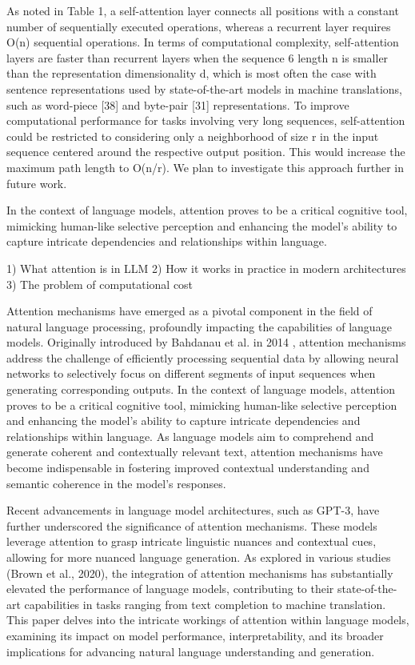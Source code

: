 As noted in Table 1, a self-attention layer connects all positions with a constant number of sequentially
executed operations, whereas a recurrent layer requires O(n) sequential operations. In terms of
computational complexity, self-attention layers are faster than recurrent layers when the sequence
6
length n is smaller than the representation dimensionality d, which is most often the case with
sentence representations used by state-of-the-art models in machine translations, such as word-piece
[38] and byte-pair [31] representations. To improve computational performance for tasks involving
very long sequences, self-attention could be restricted to considering only a neighborhood of size r in
the input sequence centered around the respective output position. This would increase the maximum
path length to O(n/r). We plan to investigate this approach further in future work.





In the context of language models, attention proves to be a critical cognitive tool, mimicking human-like selective perception and enhancing the model's ability to capture intricate dependencies and relationships within language.


1) What attention is in LLM
2) How it works in practice in modern architectures
3) The problem of computational cost



Attention mechanisms have emerged as a pivotal component in the field of natural language processing, profoundly impacting the capabilities of language models. Originally introduced by Bahdanau et al. in 2014 \cite{bahdanau2014neural}, attention mechanisms address the challenge of efficiently processing sequential data by allowing neural networks to selectively focus on different segments of input sequences when generating corresponding outputs. In the context of language models, attention proves to be a critical cognitive tool, mimicking human-like selective perception and enhancing the model's ability to capture intricate dependencies and relationships within language. As language models aim to comprehend and generate coherent and contextually relevant text, attention mechanisms have become indispensable in fostering improved contextual understanding and semantic coherence in the model's responses.

Recent advancements in language model architectures, such as GPT-3, have further underscored the significance of attention mechanisms. These models leverage attention to grasp intricate linguistic nuances and contextual cues, allowing for more nuanced language generation. As explored in various studies (Brown et al., 2020), the integration of attention mechanisms has substantially elevated the performance of language models, contributing to their state-of-the-art capabilities in tasks ranging from text completion to machine translation. This paper delves into the intricate workings of attention within language models, examining its impact on model performance, interpretability, and its broader implications for advancing natural language understanding and generation.







